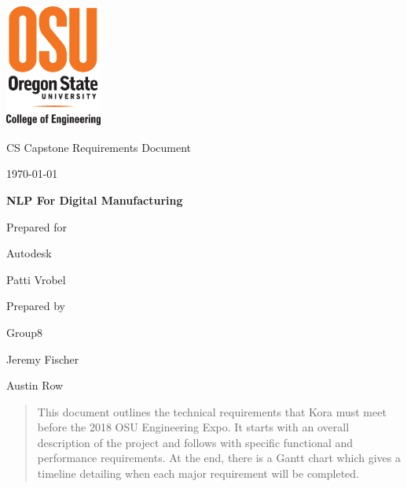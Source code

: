 \documentclass[onecolumn, draftclsnofoot,10pt, compsoc]{IEEEtran}
\def \CapstoneTeamName{\textbf{Insert Team Name Here} }
\def \CapstoneTeamNumber{8}
\def \GroupMemberOne{Jeremy Fischer}
\def \GroupMemberTwo{Austin Row}
\def \CapstoneProjectName{NLP For Digital Manufacturing}
\def \CapstoneSponsorCompany{Autodesk}
\def \CapstoneSponsorPerson{Patti Vrobel}
\def \botname{Kora\xspace}
\def \DocType{		%
				Requirements Document
				}
\newcommand{\NameSigPair}[1]{\par
\makebox[2.75in][r]{#1} \hfil 	\makebox[3.25in]{\makebox[2.25in]{\hrulefill} \hfill		\makebox[.75in]{\hrulefill}}
\par\vspace{-12pt} \textit{\tiny\noindent
\makebox[2.75in]{} \hfil		\makebox[3.25in]{\makebox[2.25in][r]{Signature} \hfill	\makebox[.75in][r]{Date}}}}
\renewcommand{\NameSigPair}[1]{#1}
\begin{document}
\begin{titlepage}
    \begin{singlespace}
    	\includegraphics[height=4cm]{coe_v_spot1}
        \par\vspace{.2in}
        \centering
        \scshape{
            \huge CS Capstone \DocType \par
            {\large\today}\par
            \vspace{.5in}
            \textbf{\Huge\CapstoneProjectName}\par
            \vfill
            {\large Prepared for}\par
            \Huge \CapstoneSponsorCompany\par
            \vspace{5pt}
            {\Large\NameSigPair{\CapstoneSponsorPerson}\par}
            {\large Prepared by }\par
            Group\CapstoneTeamNumber\par
            \vspace{5pt}
            {\Large
                \NameSigPair{\GroupMemberOne}\par
                \NameSigPair{\GroupMemberTwo}\par
            }
            \vspace{20pt}
        }
        \begin{abstract}
       		This document outlines the technical requirements that \botname must meet before the 2018 OSU Engineering Expo. 
            It starts with an overall description of the project and follows with specific functional and performance requirements.
            At the end, there is a Gantt chart which gives a timeline detailing when each major requirement will be completed.
        \end{abstract}     
    \end{singlespace}
\end{titlepage}
\newpage
{}
\tableofcontents
\clearpage
\end{document}
